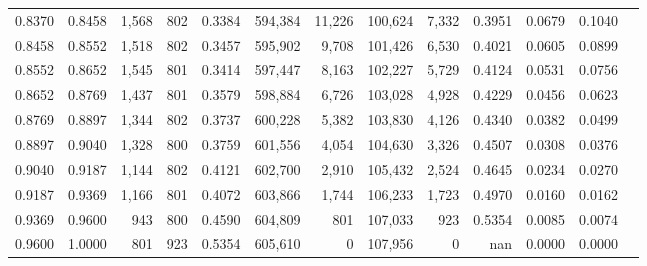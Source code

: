 \begin{tabular}{rrrrrrrrrrrrr}
0.8370 & 0.8458 &  1,568 & 802 &                                     0.3384 & 594,384 &  11,226 & 100,624 &   7,332 & 0.3951 & 0.0679 & 0.1040 \\
0.8458 & 0.8552 &  1,518 & 802 &                                     0.3457 & 595,902 &   9,708 & 101,426 &   6,530 & 0.4021 & 0.0605 & 0.0899 \\
0.8552 & 0.8652 &  1,545 & 801 &                                     0.3414 & 597,447 &   8,163 & 102,227 &   5,729 & 0.4124 & 0.0531 & 0.0756 \\
0.8652 & 0.8769 &  1,437 & 801 &                                     0.3579 & 598,884 &   6,726 & 103,028 &   4,928 & 0.4229 & 0.0456 & 0.0623 \\
0.8769 & 0.8897 &  1,344 & 802 &                                     0.3737 & 600,228 &   5,382 & 103,830 &   4,126 & 0.4340 & 0.0382 & 0.0499 \\
0.8897 & 0.9040 &  1,328 & 800 &                                     0.3759 & 601,556 &   4,054 & 104,630 &   3,326 & 0.4507 & 0.0308 & 0.0376 \\
0.9040 & 0.9187 &  1,144 & 802 &                                     0.4121 & 602,700 &   2,910 & 105,432 &   2,524 & 0.4645 & 0.0234 & 0.0270 \\
0.9187 & 0.9369 &  1,166 & 801 &                                     0.4072 & 603,866 &   1,744 & 106,233 &   1,723 & 0.4970 & 0.0160 & 0.0162 \\
0.9369 & 0.9600 &    943 & 800 &                                     0.4590 & 604,809 &     801 & 107,033 &     923 & 0.5354 & 0.0085 & 0.0074 \\
0.9600 & 1.0000 &    801 & 923 &                                     0.5354 & 605,610 &       0 & 107,956 &       0 &    nan & 0.0000 & 0.0000 \\
\bottomrule
\end{tabular}
